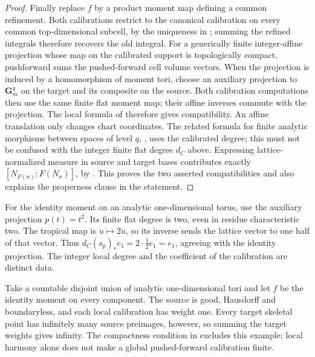 \begin{proof}
Finally replace \(f\) by a product moment map defining a common refinement.
Both calibrations restrict to the canonical calibration on every common
top-dimensional subcell, by the uniqueness in
\cite[Lemma~14.3.4]{CLD25}; summing the refined integrals therefore recovers
the old integral.  For a generically finite integer-affine projection whose
map on the calibrated support is topologically compact, pushforward sums
the pushed-forward cell volume vectors.  When the projection is induced
by a homomorphism of moment tori, choose an auxiliary projection to
\(\mathbf G_m^q\) on the target and its composite on the source.
Both calibration computations then use the same finite flat moment map;
their affine inverses commute with the projection.  The local formula of
\cite[\S14.3.2]{CLD25} therefore gives compatibility.  An affine translation
only changes chart coordinates.  The related formula for finite analytic
morphisms between spaces of level \(q\),
\cite[Proposition~14.4.2]{CLD25}, uses the calibrated degree; this must not
be confused with the integer finite flat degree \(d_C\) above.
Expressing lattice-normalized measure in source and target bases contributes exactly
\([N_{F(\sigma)}:F(N_\sigma)]\), by
.  This proves the two asserted
compatibilities and also explains the properness clause in the statement.
\end{proof}

\begin{example}
\label{ex:appG-degree-index}
For the identity moment on an analytic one-dimensional torus, use the
auxiliary projection \(p(t)=t^2\).  Its finite flat degree is two, even
in residue characteristic two.  The tropical map is \(u\mapsto2u\),
so its inverse sends the lattice vector to one half of that vector.
Thus \(d_C(s_p)_*e_1=2\cdot\tfrac12e_1=e_1\), agreeing with the
identity projection.  The integer local degree and the coefficient of
the calibration are distinct data.
\end{example}

\begin{example}
\label{ex:appG-infinite-target-fibre}
Take a countable disjoint union of analytic one-dimensional tori and let
\(f\) be the identity moment on every component.  The source is good,
Hausdorff and boundaryless, and each local calibration has weight one.
Every target skeletal point has infinitely many source preimages, however,
so summing the target weights gives infinity.  The compactness condition
in  excludes this example; local
harmony alone does not make a global pushed-forward calibration finite.
\end{example}

